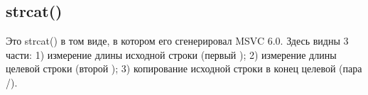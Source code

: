 \subsection{strcat()}

Это strcat() в том виде, в котором его сгенерировал MSVC 6.0.
Здесь видны 3 части:
1) измерение длины исходной строки (первый );
2) измерение длины целевой строки (второй );
3) копирование исходной строки в конец целевой (пара /).



